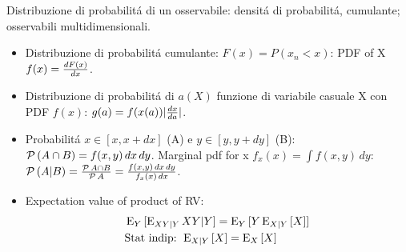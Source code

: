 \begin{frame}{Distribuzione di probabilit\'a di un osservabile: densit\'a di probabilit\'a, cumulante; osservabili multidimensionali.}
\begin{itemize}
\item Distribuzione di probabilit\'a cumulante: $F(x)=P(x_n<x)$: PDF of X $f(x)=\TDy{x}{F(x)}$.
\item Distribuzione di probabilit\'a di $a(X)$ funzione di variabile casuale X con PDF $f(x)$: $g(a)=f(x(a))|\TDy{a}{x}|$.
\item Probabilit\'a $x\in[x,x+dx]$ (A) e $y\in[y,y+dy]$ (B): $\prob{(A\cap B)}=f(x,y)\,dx\,dy$. Marginal pdf for x $f_x(x)=\int f(x,y)\,dy$: $\prob{(A|B)}=\frac{\prob{A\cap B}}{\prob{A}}=\frac{f(x,y)\,dx\,dy}{f_x(x)\,dx}$.
\item Expectation value of product of RV:%
\begin{align*}
&\E_Y{[\E_{XY|Y}{XY|Y}]}=\E_Y{[Y\E_{X|Y}{[X]}]}\\
&\text{Stat indip: }\E_{X|Y}{[X]}=\E_X{[X]}
\end{align*}
\end{itemize}
\end{frame}

